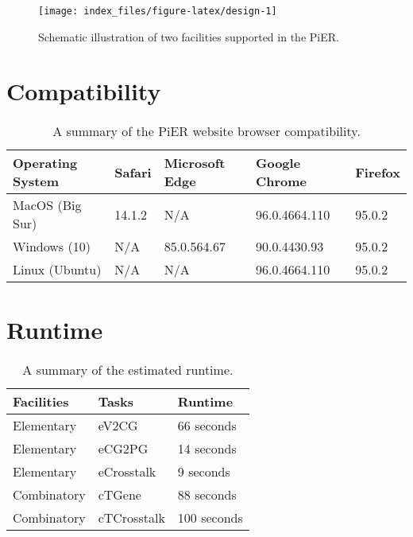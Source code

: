 \documentclass[
  oneside]{book}
\begin{document}
\begin{figure}

{\centering \texttt{[image: index\_files/figure-latex/design-1]} 

}

\caption{Schematic illustration of two facilities supported in the PiER.}\label{fig:design}
\end{figure}

\hypertarget{compatibility}{%
\chapter{Compatibility}\label{compatibility}}

\begin{table}

\caption{\label{tab:unnamed-chunk-3}A summary of the PiER website browser compatibility.}
\centering
\begin{tabular}[t]{l|l|l|l|l}
\hline
Operating System & Safari & Microsoft Edge & Google Chrome & Firefox\\
\hline
MacOS (Big Sur) & 14.1.2 & N/A & 96.0.4664.110 & 95.0.2\\
\hline
Windows (10) & N/A & 85.0.564.67 & 90.0.4430.93 & 95.0.2\\
\hline
Linux (Ubuntu) & N/A & N/A & 96.0.4664.110 & 95.0.2\\
\hline
\end{tabular}
\end{table}

\hypertarget{runtime}{%
\chapter{Runtime}\label{runtime}}

\begin{table}

\caption{\label{tab:unnamed-chunk-4}A summary of the estimated runtime.}
\centering
\begin{tabular}[t]{l|l|l}
\hline
Facilities & Tasks & Runtime\\
\hline
Elementary & eV2CG & 66 seconds\\
\hline
Elementary & eCG2PG & 14 seconds\\
\hline
Elementary & eCrosstalk & 9 seconds\\
\hline
Combinatory & cTGene & 88 seconds\\
\hline
Combinatory & cTCrosstalk & 100 seconds\\
\hline
\end{tabular}
\end{table}
\end{document}
